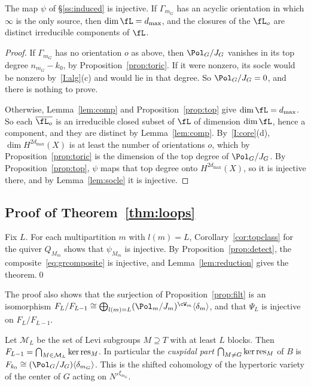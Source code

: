\documentclass[11pt]{amsart}
\begin{document}
\begin{corollary}\label{cor:topclass}
The map $\psi$ of \S\ref{ss:induced} is injective.  If $\Gamma_{m_G}$ has an
acyclic orientation in which $\infty$ is the only source, then
$\dim\fL=d_{\max}$, and the closures of the $\fL_o$ are distinct irreducible
components of $\fL$.
\end{corollary}

\begin{proof}
If $\Gamma_{m_G}$ has no orientation $o$ as above, then $\Pol_G/J_G$ vanishes
in its top degree $n_{m_G}-k_0$, by Proposition~\ref{prop:toric}.  If it were
nonzero, its socle would be nonzero by~\ref{I:alg}(c) and would lie in that
degree.  So $\Pol_G/J_G=0$, and there is nothing to prove.

Otherwise, Lemma~\ref{lem:comp} and Proposition~\ref{prop:top} give
$\dim\fL=d_{\max}$.  So each $\overline{\fL_o}$ is an irreducible closed
subset of $\fL$ of dimension $\dim\fL$, hence a component, and they are
distinct by Lemma~\ref{lem:comp}.  By~\ref{I:core}(d), $\dim
H^{2d_{\max}}(X)$ is at least the number of orientations $o$, which by
Proposition~\ref{prop:toric} is the dimension of the top degree of
$\Pol_G/J_G$.  By Proposition~\ref{prop:top}, $\psi$ maps that top degree onto
$H^{2d_{\max}}(X)$, so it is injective there, and by Lemma~\ref{lem:socle} it
is injective.
\end{proof}

\subsection{Proof of Theorem~\ref{thm:loops}}\label{ss:proof}
Fix $L$.  For each multipartition $m$ with $l(m)=L$,
Corollary~\ref{cor:topclass} for the quiver $Q_{M_m}$ shows that $\psi_{M_m}$
is injective.  By Proposition~\ref{prop:detect}, the
composite~\eqref{eq:grcomposite} is injective, and
Lemma~\ref{lem:reduction} gives the theorem.\qed

\medskip
The proof also shows that the surjection of Proposition~\ref{prop:filt} is an
isomorphism
$F_L/F_{L-1}\cong\bigoplus_{l(m)=L}(\Pol_m/J_m)^{\cW_m}\langle\delta_m\rangle$, and
that $\Psi_L$ is injective on $F_L/F_{L-1}$.

\begin{corollary}\label{cor:cusp}
Let $\mathcal M_L$ be the set of Levi subgroups $M\supseteq T$ with at
least $L$ blocks.  Then $F_{L-1}=\bigcap_{M\in\mathcal M_L}\ker\operatorname{res}_M$.  In
particular the \emph{cuspidal part}
$\bigcap_{M\neq G}\ker\operatorname{res}_M$ of $B$ is $F_{k_0}\cong(\Pol_G/J_G)\langle\delta_{m_G}\rangle$.
This is the shifted cohomology of the hypertoric variety of the center of
$G$ acting on $N'^{\xi_{m_G}}$.
\end{corollary}
\end{document}
